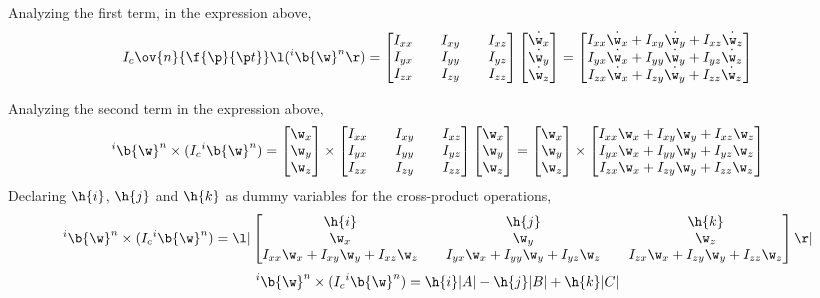 \documentclass[a4paper, 12pt]{report}
\begin{document}
\begin{center}
Analyzing the first term, in the expression above,
$$I_c\ov{n}{\f{\p}{\p t}}\l({}^i\b{\w}^n\r) = \begin{bmatrix}
I_{xx} && I_{xy} && I_{xz} \\
I_{yx} && I_{yy} && I_{yz} \\
I_{zx} && I_{zy} && I_{zz}
\end{bmatrix} \begin{bmatrix}
\dot{\w_x} \\ \dot{\w_y} \\ \dot{\w_z}
\end{bmatrix} = \begin{bmatrix} 
I_{xx}\dot{\w_x} + I_{xy}\dot{\w_y} + I_{xz}\dot{\w_z} \\
I_{yx}\dot{\w_x} + I_{yy}\dot{\w_y} + I_{yz}\dot{\w_z} \\
I_{zx}\dot{\w_x} + I_{zy}\dot{\w_y} + I_{zz}\dot{\w_z}
\end{bmatrix}$$

Analyzing the second term in the expression above,
$${}^i\b{\w}^n\times (I_c {}^i\b{\w}^n) = \begin{bmatrix}
\w_x \\ \w_y \\ \w_z
\end{bmatrix}\times\begin{bmatrix}
I_{xx} && I_{xy} && I_{xz} \\
I_{yx} && I_{yy} && I_{yz} \\
I_{zx} && I_{zy} && I_{zz}
\end{bmatrix}\begin{bmatrix}
\w_x \\ \w_y \\ \w_z
\end{bmatrix} = \begin{bmatrix}
\w_x \\ \w_y \\ \w_z
\end{bmatrix}\times\begin{bmatrix}
I_{xx}\w_x + I_{xy}\w_y + I_{xz}\w_z \\
I_{yx}\w_x + I_{yy}\w_y + I_{yz}\w_z \\
I_{zx}\w_x + I_{zy}\w_y + I_{zz}\w_z
\end{bmatrix}$$
Declaring $\h{i}$, $\h{j}$ and $\h{k}$ as dummy variables for the cross-product operations,
$${}^i\b{\w}^n\times (I_c {}^i\b{\w}^n) = \l|\begin{bmatrix}
\h{i} && \h{j} && \h{k} \\
\w_x && \w_y && \w_z \\
I_{xx}\w_x + I_{xy}\w_y + I_{xz}\w_z && I_{yx}\w_x + I_{yy}\w_y + I_{yz}\w_z && I_{zx}\w_x + I_{zy}\w_y + I_{zz}\w_z
\end{bmatrix}\r|$$
$${}^i\b{\w}^n\times (I_c {}^i\b{\w}^n) = \h{i}|A| - \h{j}|B| + \h{k}|C|$$


\end{center}
\end{document}
